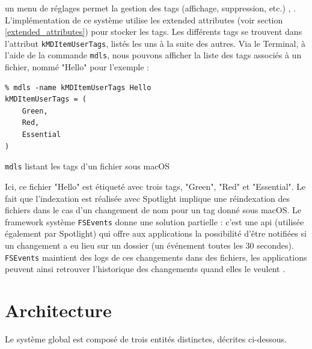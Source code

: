 \documentclass[a4paper, 12pt]{article}
\newenvironment{code}{\captionsetup{type=listing}}{}
\begin{document}
un menu de réglages permet la gestion des tags (affichage, suppression, etc.) \cite{ref5}, 
\cite{ref6}. L'implémentation de ce système utilise les extended attributes (voir section 
\ref{extended_attributes}) pour stocker les tags. Les différents tags se trouvent dans l'attribut 
\texttt{kMDItemUserTags}, listés les uns à la suite des autres. Via le Terminal, à 
l'aide de la commande \texttt{mdls}, nous pouvons afficher la liste des tags associés à 
un fichier, nommé "Hello" pour l'exemple :
\bigbreak
\begin{code}
    \begin{verbatim}
% mdls -name kMDItemUserTags Hello 
kMDItemUserTags = (
    Green,
    Red,
    Essential
)
    \end{verbatim}
    \caption{\texttt{mdls} listant les tags d'un fichier sous macOS \cite{ref7}}
\end{code}
\bigbreak
Ici, ce fichier "Hello" est étiqueté avec trois tags, "Green", "Red" et "Essential". Le fait que 
l'indexation est réalisée avec Spotlight implique une réindexation des fichiers dans le cas d'un 
changement de nom pour un tag donné sous macOS. Le framework système \texttt{FSEvents} 
donne une solution partielle : c'est une \acrshort{api} (utilisée également par Spotlight) qui offre aux 
applications la possibilité d'être notifiées si un changement a eu lieu sur un dossier (un événement 
toutes les 30 secondes). \texttt{FSEvents} maintient des logs de ces changements dans 
des fichiers, les applications peuvent ainsi retrouver l'historique des changements quand elles 
le veulent \cite{ref10}.

\newpage



\section{Architecture} %

Le système global est composé de trois entités distinctes, décrites ci-dessous.
\end{document}
